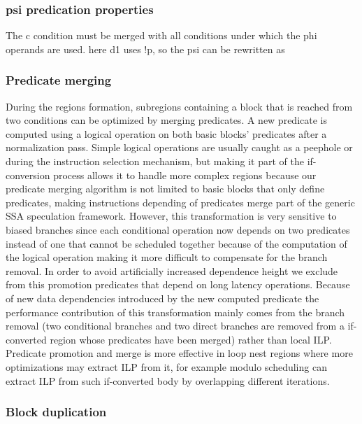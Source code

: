 \subsubsection{psi predication properties}

The c condition must be merged with all conditions under which the phi operands are used. here d1 uses !p, so the psi can be rewritten as

\subsubsection{Predicate merging}

During the regions formation, subregions containing a block that is reached from two conditions can be optimized by merging predicates. A new predicate is computed using a logical operation on both basic blocks' predicates after a normalization pass. Simple logical operations are usually caught as a peephole or during the instruction selection mechanism, but making it part of the if-conversion process allows it to handle more complex regions because our predicate merging algorithm is not limited to basic blocks that only define predicates, making instructions depending of predicates merge part of the generic SSA speculation framework. However, this transformation is very sensitive to biased branches since each conditional operation now depends on two predicates instead of one that cannot be scheduled together because of the computation of the logical operation making it more difficult to compensate for the branch removal. In order to avoid artificially increased dependence height we exclude from this promotion predicates that depend on long latency operations.
Because of new data dependencies introduced by the new computed predicate the performance contribution of this transformation mainly comes from the branch removal (two conditional branches and two direct branches are removed from a if-converted region whose predicates have been merged) rather than local ILP. Predicate promotion and merge is more effective in loop nest regions where more optimizations may extract ILP from it, for example modulo scheduling can extract ILP from such if-converted body by overlapping different iterations. 

\subsubsection{Block duplication}

